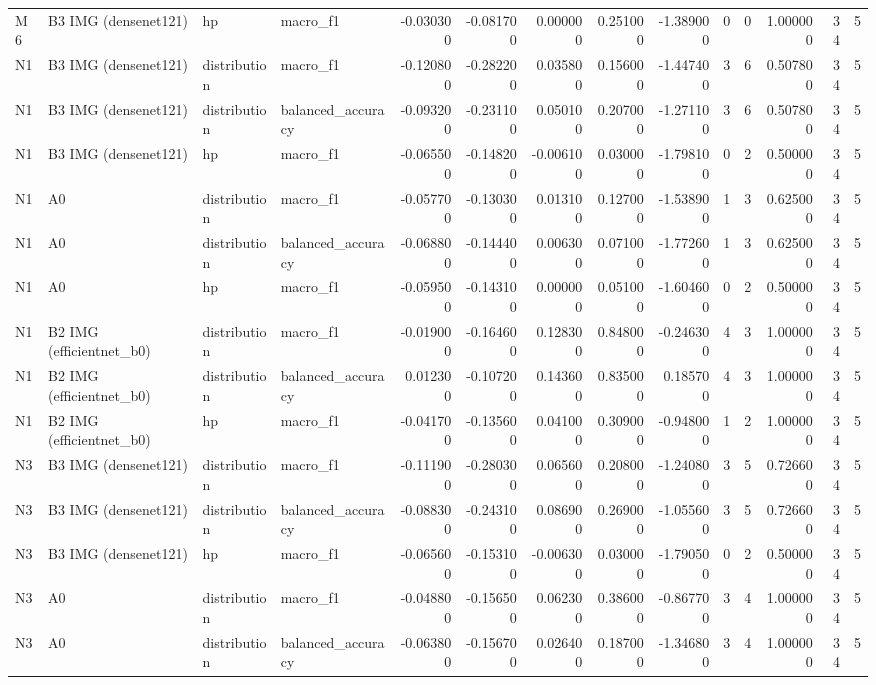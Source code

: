 \begin{table}
\begin{tabular}{llllrrrrrrrrrr}
M6 & B3 IMG (densenet121) & hp & macro\_f1 & -0.030300 & -0.081700 & 0.000000 & 0.251000 & -1.389000 & 0 & 0 & 1.000000 & 34 & 5 \\
N1 & B3 IMG (densenet121) & distribution & macro\_f1 & -0.120800 & -0.282200 & 0.035800 & 0.156000 & -1.447400 & 3 & 6 & 0.507800 & 34 & 5 \\
N1 & B3 IMG (densenet121) & distribution & balanced\_accuracy & -0.093200 & -0.231100 & 0.050100 & 0.207000 & -1.271100 & 3 & 6 & 0.507800 & 34 & 5 \\
N1 & B3 IMG (densenet121) & hp & macro\_f1 & -0.065500 & -0.148200 & -0.006100 & 0.030000 & -1.798100 & 0 & 2 & 0.500000 & 34 & 5 \\
N1 & A0 & distribution & macro\_f1 & -0.057700 & -0.130300 & 0.013100 & 0.127000 & -1.538900 & 1 & 3 & 0.625000 & 34 & 5 \\
N1 & A0 & distribution & balanced\_accuracy & -0.068800 & -0.144400 & 0.006300 & 0.071000 & -1.772600 & 1 & 3 & 0.625000 & 34 & 5 \\
N1 & A0 & hp & macro\_f1 & -0.059500 & -0.143100 & 0.000000 & 0.051000 & -1.604600 & 0 & 2 & 0.500000 & 34 & 5 \\
N1 & B2 IMG (efficientnet\_b0) & distribution & macro\_f1 & -0.019000 & -0.164600 & 0.128300 & 0.848000 & -0.246300 & 4 & 3 & 1.000000 & 34 & 5 \\
N1 & B2 IMG (efficientnet\_b0) & distribution & balanced\_accuracy & 0.012300 & -0.107200 & 0.143600 & 0.835000 & 0.185700 & 4 & 3 & 1.000000 & 34 & 5 \\
N1 & B2 IMG (efficientnet\_b0) & hp & macro\_f1 & -0.041700 & -0.135600 & 0.041000 & 0.309000 & -0.948000 & 1 & 2 & 1.000000 & 34 & 5 \\
N3 & B3 IMG (densenet121) & distribution & macro\_f1 & -0.111900 & -0.280300 & 0.065600 & 0.208000 & -1.240800 & 3 & 5 & 0.726600 & 34 & 5 \\
N3 & B3 IMG (densenet121) & distribution & balanced\_accuracy & -0.088300 & -0.243100 & 0.086900 & 0.269000 & -1.055600 & 3 & 5 & 0.726600 & 34 & 5 \\
N3 & B3 IMG (densenet121) & hp & macro\_f1 & -0.065600 & -0.153100 & -0.006300 & 0.030000 & -1.790500 & 0 & 2 & 0.500000 & 34 & 5 \\
N3 & A0 & distribution & macro\_f1 & -0.048800 & -0.156500 & 0.062300 & 0.386000 & -0.867700 & 3 & 4 & 1.000000 & 34 & 5 \\
N3 & A0 & distribution & balanced\_accuracy & -0.063800 & -0.156700 & 0.026400 & 0.187000 & -1.346800 & 3 & 4 & 1.000000 & 34 & 5 \\

\end{tabular}
\end{table}
